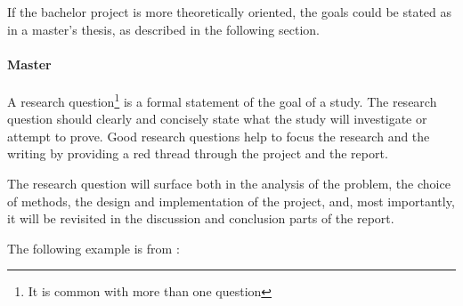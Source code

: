 If the bachelor project is more theoretically oriented, the goals could be stated as in a master’s thesis, as described in the following section.

\paragraph{Master}

A research question\footnote{It is common with more than one question} is a formal statement of the goal of a study. The research question should clearly and concisely state what the study will investigate or attempt to prove. 
Good research questions help to focus the research and the writing by providing a red thread through the project and the report. 

The research question will surface both in the analysis of the problem, the choice of methods, the design and implementation of the project, and,  most importantly, it will be revisited in the discussion and conclusion parts of the report.

The following example is from \cite{killerud14sgs}:


